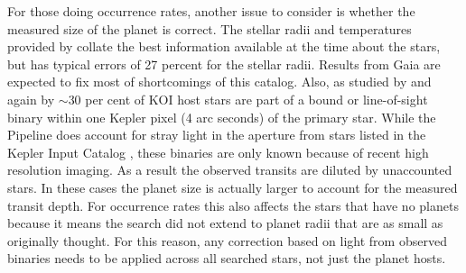 For those doing occurrence rates, another issue to consider is whether the measured size of the planet is correct. The stellar radii and temperatures provided by \citet{Mathur2017ApJS} collate the best information available at the time about the \Kepler{} stars, but has typical errors of 27 percent for the stellar radii. Results from Gaia \citep{Gaia2016} are expected to fix most of shortcomings of this catalog. Also, as studied by \citep{Ciardi2015} and again by \citep{Furlan2017} $\sim$30 per cent of KOI host stars are part of a bound or line-of-sight binary within one Kepler pixel (4 arc seconds) of the primary star. While the \Kepler{} Pipeline does account for stray light in the aperture from stars listed in the Kepler Input Catalog \citep{Brown2011}, these binaries are only known because of recent high resolution imaging. As a result the observed transits are diluted by unaccounted stars. In these cases the planet size is actually larger to account for the measured transit depth. For occurrence rates this also affects the stars that have no planets because it means the search did not extend to planet radii that are as small as originally thought.  For this reason, any correction based on light from observed binaries needs to be applied across all searched stars, not just the planet hosts.



